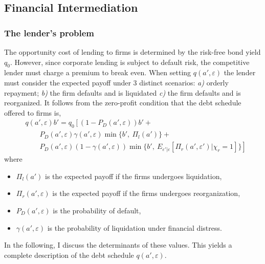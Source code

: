 \documentclass[12pt]{article}
\begin{document}
\subsection{Financial Intermediation}  \label{sec: Financial Intermediation}
\subsubsection{The lender's problem}    \label{sec: The lender's problem}
The opportunity cost of lending to firms is determined by the risk-free bond yield $q_0$. However, since corporate lending is subject to default risk, the competitive lender must charge a premium to break even. When setting $q(a',\varepsilon)$ the lender must consider the expected payoff under 3 distinct scenarios: \textit{a)} orderly repayment; \textit{b)} the firm defaults and is liquidated \textit{c)} the firm defaults and is reorganized. It follows from the zero-profit condition that the debt schedule offered to firms is, 
\begin{equation} \label{eq:q}
    \begin{split}
        & q(a', \varepsilon)b' = q_0 \left[ \left(1-P_D(a', \varepsilon)\right)b' + \right. \\
        & \qquad P_D(a', \varepsilon) \gamma(a', \varepsilon) \min \{b', \ \Pi_{l}(a')\} + \\ 
        & \qquad \left. P_D(a', \varepsilon) (1-\gamma(a', \varepsilon))\min \{b', \ E_{\varepsilon' | \varepsilon} [ \Pi_{r}(a', \varepsilon') |\chi_r = 1 ] \} \right]
    \end{split}
\end{equation}
where 
\begin{itemize}\setlength\itemsep{0em} 
    \item $\Pi_{l}(a')$ is the expected payoff if the firms undergoes liquidation,
    \item $\Pi_{r}(a', \varepsilon)$ is the expected payoff if the firms undergoes reorganization,
    \item $P_D(a', \varepsilon)$ is the probability of default,
    \item $\gamma(a', \varepsilon)$ is the probability of liquidation under financial distress. 
\end{itemize} 
In the following, I discuss the determinants of these values. This yields a complete description of the debt schedule $q(a', \varepsilon)$.
 
\end{document}
